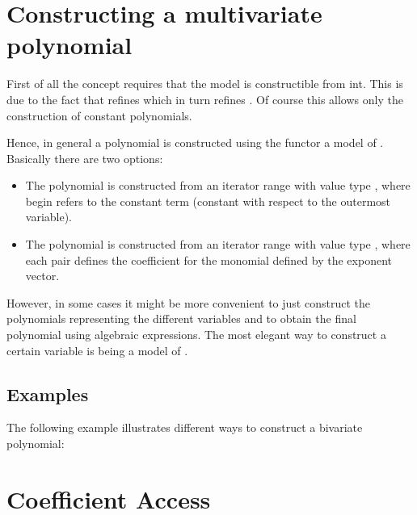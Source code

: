 \section{Constructing a multivariate polynomial}

First of all the concept  requires that the model is constructible from int. 
This is due to the fact that  refines  
which in turn refines . Of course this allows only the construction of 
constant polynomials. 

Hence, in general a polynomial is constructed using the functor 
 a model of 
.  Basically there are two options:
\begin{itemize}
\item The polynomial is constructed from an iterator range with value type 
, where begin refers to 
the constant term (constant with respect to the outermost variable). 
\item The polynomial is constructed from an iterator range with value type 
,
where each pair defines the coefficient for the monomial defined by the exponent vector. 
\end{itemize}

However, in some cases it might be more convenient to just construct the polynomials 
representing the different variables and to obtain the final polynomial using 
algebraic expressions. The most elegant way to construct a certain variable is 
 being a model of 
. 

\subsection{Examples}

The following example illustrates different ways to construct a bivariate polynomial:



\section{Coefficient Access}
 
